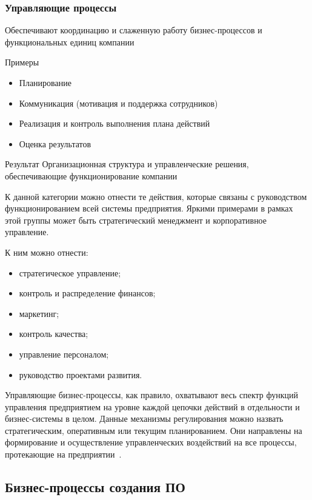 \documentclass{../industrial-development}
\begin{document}
\begin{frame} \frametitle{Управляющие процессы}
	\begin{block}{}
		Обеспечивают координацию и слаженную работу бизнес-процессов и функциональных единиц компании
	\end{block}
	\begin{block}{Примеры}
		\begin{itemize}
		\item Планирование
		\item Коммуникация (мотивация и поддержка сотрудников)
		\item Реализация и контроль выполнения плана действий
		\item Оценка результатов
		\end{itemize}
	\end{block}
	\begin{block}{Результат}
		Организационная структура и управленческие решения, обеспечивающие функционирование компании
	\end{block}
\end{frame}

\lecturenotes

К данной категории можно отнести те действия, которые связаны с руководством функционированием всей системы предприятия. Яркими примерами в рамках этой группы может быть стратегический менеджмент и корпоративное управление.

К ним можно отнести:
\begin{itemize}
	\item стратегическое управление;
	\item контроль и распределение финансов;
	\item маркетинг;
	\item контроль качества;
	\item управление персоналом;
	\item руководство проектами развития.
\end{itemize}

Управляющие бизнес-процессы, как правило, охватывают весь спектр функций управления предприятием на уровне каждой цепочки действий в отдельности и бизнес-системы в целом. Данные механизмы регулирования можно назвать стратегическим, оперативным или текущим планированием. Они направлены на формирование и осуществление управленческих воздействий на все процессы, протекающие на предприятии~\cite{Vseproip}.


\subsection{Бизнес-процессы создания ПО}
\end{document}
